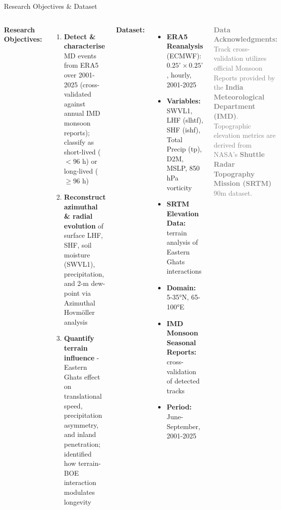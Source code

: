 \documentclass[aspectratio=169,t,xcolor=table]{beamer}
\begin{document}
\begin{frame}{Research Objectives \& Dataset}
  \begin{columns}
    \textbf{\small Research Objectives:}
    \footnotesize
    \begin{enumerate}
      \item \textbf{Detect \& characterise} MD events from ERA5 over
        2001-2025 (cross-validated against annual IMD monsoon
        reports); classify as short-lived ($<96$ h) or long-lived ($\geq 96$ h)
      \item \textbf{Reconstruct azimuthal \& radial evolution} of
        surface LHF, SHF, soil moisture (SWVL1), precipitation, and
        2-m dew-point via Azimuthal Hovmöller analysis
      \item \textbf{Quantify terrain influence} - Eastern Ghats
        effect on translational speed, precipitation asymmetry, and
        inland penetration; identified how terrain-BOE interaction
        modulates longevity
    \end{enumerate}

    \textbf{\small Dataset:}
    \footnotesize
    \begin{itemize}
      \item \textbf{ERA5 Reanalysis} (ECMWF): $0.25^\circ \times 0.25^\circ$, hourly, 2001-2025
      \item \textbf{Variables:} SWVL1, LHF (slhtf), SHF (ishf), Total Precip (tp), D2M, MSLP, 850 hPa vorticity
      \item \textbf{SRTM Elevation Data:} terrain analysis of Eastern Ghats interactions
      \item \textbf{Domain:} 5-35°N, 65-100°E
      \item \textbf{IMD Monsoon Seasonal Reports:} cross-validation of detected tracks
      \item \textbf{Period:} June-September, 2001-2025
    \end{itemize}

    \vspace{0.15cm}
    \tiny\textcolor{gray}{\textbf{Data Acknowledgments:} Track cross-validation utilizes official Monsoon Reports provided by the \textbf{India Meteorological Department (IMD)}. Topographic elevation metrics are derived from NASA's \textbf{Shuttle Radar Topography Mission (SRTM)} 90m dataset.}
  \end{columns}
\end{frame}
\end{document}
